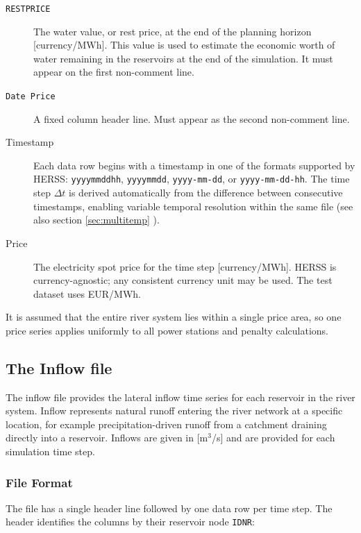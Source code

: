 \documentclass[a4paper, 12pt]{report}
\begin{document}
	\begin{description}
	\item[\texttt{RESTPRICE}] The water value, or rest price, at the end of the
	planning horizon [currency/MWh]. This value is used to estimate the economic
	worth of water remaining in the reservoirs at the end of the simulation.
	It must appear on the first non-comment line.
	
	\item[\texttt{Date Price}] A fixed column header line. Must appear as the second
	non-comment line.
	
	\item[Timestamp] Each data row begins with a timestamp in one of the formats
	supported by HERSS: \texttt{yyyymmddhh}, \texttt{yyyymmdd}, \texttt{yyyy-mm-dd},
	or \texttt{yyyy-mm-dd-hh}. The time step $\Delta t$ is derived automatically
	from the difference between consecutive timestamps, enabling variable temporal
	resolution within the same file (see also section \ref{sec:multitemp} ).
	
	\item[Price] The electricity spot price for the time step [currency/MWh]. HERSS is
	currency-agnostic; any consistent currency unit may be used. The test dataset
	uses EUR/MWh.
	\end{description}

	It is assumed that the entire river system lies within a single price area, so one price
	series applies uniformly to all power stations and penalty calculations.

	\subsection{The Inflow file}
	\label{sec:inflowfile}

	The inflow file provides the lateral inflow time series for each reservoir in the river system. Inflow represents natural runoff entering the river network at a specific location, for	example precipitation-driven runoff from a catchment draining directly into a reservoir.
	Inflows are given in [m$^3$/s] and are provided for each simulation time step.

	\subsubsection{File Format}
	The file has a single header line followed by one data row per time step. The header
	identifies the columns by their reservoir node \texttt{IDNR}:
\end{document}
